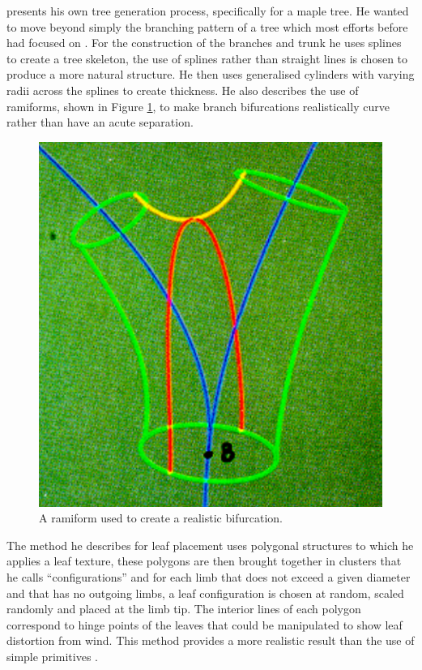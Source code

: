 \documentclass[final]{cmpreport}
\begin{document}
\cite{bloomenthal1985modeling} presents his own tree generation process, specifically 
for a maple tree. He wanted to move beyond simply the branching pattern of a tree which 
most efforts before had focused on \citep{brooks1974geometry,marshall1980procedure,kawaguchi1982morphological,aono1984botanical,smith1984plants}.
For the construction of the branches and trunk he uses splines to create a tree skeleton, 
the use of splines rather than straight lines is chosen to produce a more natural structure. 
He then uses generalised cylinders with varying radii across the splines to create thickness. 
He also describes the use of ramiforms, shown in Figure \ref{fig:bloomenthal-ramiform}, to 
make branch bifurcations realistically curve rather than have an acute separation.

\begin{figure}[ht]
    \includegraphics[scale=0.35]{bloomenthal-ramiform.PNG}
    \centering
    \captionsetup{justification=centering}
    \caption{A ramiform used to create a realistic bifurcation.}
    \label{fig:bloomenthal-ramiform}
\end{figure}

The method he describes for leaf placement uses polygonal structures to which he applies 
a leaf texture, these polygons are then brought together in clusters that he calls 
``configurations'' and for each limb that does not exceed a given diameter and that has 
no outgoing limbs, a leaf configuration is chosen at random, scaled randomly and placed 
at the limb tip. The interior lines of each polygon correspond to hinge points of the 
leaves that could be manipulated to show leaf distortion from wind. This method provides 
a more realistic result than the use of simple primitives \citep{kawaguchi1982morphological,lintermann1999interactive,candussi2005rendering}.
\end{document}

